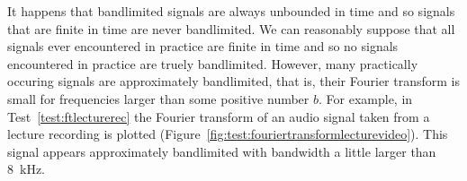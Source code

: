 \documentclass[11pt,a4paper]{book}
\theoremstyle{plain}
\numberwithin{equation}{section}
\newcommand{\complex}{{\mathbb C}}
\newcommand{\abs}[1]{\left\vert #1 \right\vert}
\newcounter{test}
\begin{document}
It happens that bandlimited signals are always unbounded in time and so signals that are finite in time are never bandlimited.  We can reasonably suppose that all signals ever encountered in practice are finite in time and so no signals encountered in practice are truely bandlimited.  However, many practically occuring signals are approximately bandlimited, that is, their Fourier transform is small for frequencies larger than some positive number $b$.  For example, in Test~\ref{test:ftlecturerec} the Fourier transform of an audio signal taken from a lecture recording is plotted  (Figure~\ref{fig:test:fouriertransformlecturevideo}).  This signal appears approximately bandlimited with bandwidth a little larger than \SI{8}{\kilo\hertz}.


\end{document}
